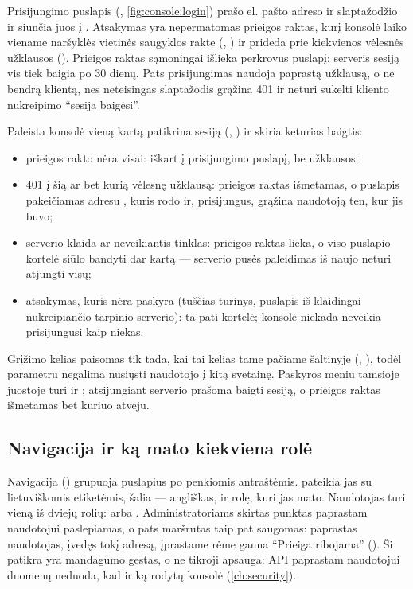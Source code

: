 Prisijungimo puslapis (, \cref{fig:console:login}) prašo el. pašto
adreso ir slaptažodžio ir siunčia juos į . Atsakymas yra
nepermatomas prieigos raktas, kurį konsolė laiko viename naršyklės vietinės saugyklos rakte
(, ) ir prideda prie kiekvienos vėlesnės užklausos
(). Prieigos raktas sąmoningai išlieka perkrovus puslapį; serveris sesiją
vis tiek baigia po 30 dienų. Pats prisijungimas naudoja paprastą užklausą, o ne bendrą klientą,
nes neteisingas slaptažodis grąžina 401 ir neturi sukelti kliento nukreipimo \enquote{sesija
baigėsi}.

Paleista konsolė vieną kartą patikrina sesiją (, )
ir skiria keturias baigtis:

\begin{itemize}
  \item prieigos rakto nėra visai: iškart į prisijungimo puslapį, be užklausos;
  \item 401 į šią ar bet kurią vėlesnę užklausą: prieigos raktas išmetamas, o puslapis
    pakeičiamas adresu , kuris rodo  ir, prisijungus, grąžina naudotoją ten, kur jis buvo;
  \item serverio klaida ar neveikiantis tinklas: prieigos raktas lieka, o viso puslapio kortelė
    siūlo bandyti dar kartą --- serverio pusės paleidimas iš naujo neturi atjungti visų;
  \item atsakymas, kuris nėra paskyra (tuščias turinys, puslapis iš klaidingai nukreipiančio
    tarpinio serverio): ta pati kortelė; konsolė niekada neveikia prisijungusi kaip niekas.
\end{itemize}

Grįžimo kelias  paisomas tik tada, kai tai kelias tame pačiame šaltinyje
(, ), todėl parametru negalima nusiųsti naudotojo į kitą
svetainę. Paskyros meniu tamsioje juostoje turi  ir ; atsijungiant
serverio prašoma baigti sesiją, o prieigos raktas išmetamas bet kuriuo atveju.

\subsection{Navigacija ir ką mato kiekviena rolė}\label{sec:console:nav}

Navigacija () grupuoja puslapius po penkiomis antraštėmis.
 pateikia jas su lietuviškomis etiketėmis, šalia --- angliškas, ir rolę,
kuri jas mato. Naudotojas turi vieną iš dviejų rolių:  arba .
Administratoriams skirtas punktas paprastam naudotojui paslepiamas, o pats maršrutas taip pat
saugomas: paprastas naudotojas, įvedęs tokį adresą, įprastame rėme gauna \enquote{Prieiga
ribojama} (). Ši patikra yra mandagumo gestas, o ne tikroji apsauga: API
paprastam naudotojui duomenų neduoda, kad ir ką rodytų konsolė (\cref{ch:security}).


